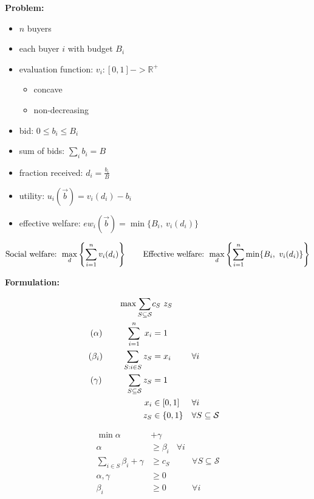 \documentclass[11pt,a4paper]{article}
\begin{document}
\textbf{Problem:}

\begin{itemize}
    \item $n$ buyers
    \item each buyer $i$ with budget $B_i$
    \item evaluation function: $v_i : [0,1] -> \mathbb{R}^+$
    \begin{itemize}
        \item concave
        \item non-decreasing
    \end{itemize}
    \item bid: $0 \le b_i \le B_i$
    \item sum of bids: $\sum_i b_i = B$
    \item fraction received: $d_i = \frac{b_i}{B}$
    \item utility: $u_i(\vec{b}) = v_i(d_i) - b_i$
    \item effective welfare: $ew_i(\vec{b}) = \min\{B_i,\ v_i(d_i)\}$
\end{itemize}

\[
    \textnormal{Social welfare: } \max_{d} \left\{\sum_{i=1}^{n}  v_i(d_i) \right\} \qquad \textnormal{Effective welfare: } \max_{d} \left\{\sum_{i=1}^{n}  \min\{B_i,\ v_i(d_i)\} \right\}
\]

\vspace{1cm}
\textbf{Formulation:}

\begin{minipage}[t]{0.59\textwidth}
	\begin{align*}
		\max  \sum_{S \subseteq \mathcal{S}} &c_{S}\ z_{S} \\
		(\alpha) \hspace{1cm} \sum_{i=1}^{n} \ x_{i} &= 1 & &  \\
		(\beta_i) \hspace{0.82cm} \sum_{S: i \in S} z_{S}  &= x_{i}	& & \forall i \\
		(\gamma) \hspace{1cm} \sum_{S \subseteq \mathcal{S}} z_{S} &= 1 & & \\
		x_{i} &\in [0,1] & & \forall i\\
		z_{S} &\in \{0,1\} & & \forall S \subseteq \mathcal{S}\\
	\end{align*}
\end{minipage}
\begin{minipage}[t]{0.3\textwidth}
	\begin{align*}
		\min \alpha &+ \gamma \\
		\alpha &\ge \beta_i  &  \forall i \\
		\sum_{i \in S} \beta_{i} + \gamma &\ge c_{S}  & & \forall S \subseteq \mathcal{S}\\
		\alpha, \gamma &\geq 0 & & \\
		\beta_i &\geq 0 & & \forall i
\end{align*}
\end{minipage}
\end{document}
